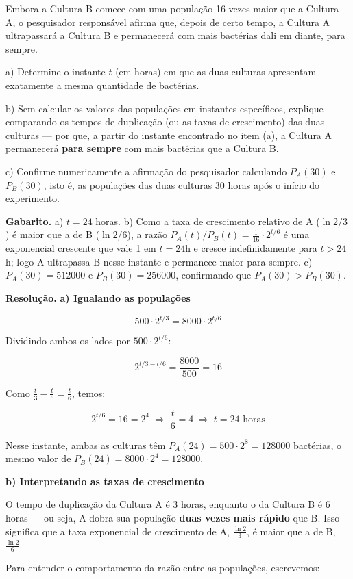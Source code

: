 \documentclass[11pt,a4paper]{article}
\begin{document}
Embora a Cultura B comece com uma população 16 vezes maior que a Cultura A, o pesquisador responsável afirma que, depois de certo tempo, a Cultura A ultrapassará a Cultura B e permanecerá com mais bactérias dali em diante, para sempre.

a) Determine o instante $t$ (em horas) em que as duas culturas apresentam exatamente a mesma quantidade de bactérias.

b) Sem calcular os valores das populações em instantes específicos, explique — comparando os tempos de duplicação (ou as taxas de crescimento) das duas culturas — por que, a partir do instante encontrado no item (a), a Cultura A permanecerá \textbf{para sempre} com mais bactérias que a Cultura B.

c) Confirme numericamente a afirmação do pesquisador calculando $P_A(30)$ e $P_B(30)$, isto é, as populações das duas culturas 30 horas após o início do experimento.

\textbf{Gabarito.} a) $t = 24$ horas. b) Como a taxa de crescimento relativo de A ($\ln 2/3$) é maior que a de B ($\ln 2/6$), a razão $P_A(t)/P_B(t) = \frac{1}{16}\cdot 2^{t/6}$ é uma exponencial crescente que vale 1 em $t=24$h e cresce indefinidamente para $t>24$h; logo A ultrapassa B nesse instante e permanece maior para sempre. c) $P_A(30)=512000$ e $P_B(30)=256000$, confirmando que $P_A(30) > P_B(30)$.

\textbf{Resolução.} \textbf{a) Igualando as populações}

$$500 \cdot 2^{t/3} = 8000 \cdot 2^{t/6}$$

Dividindo ambos os lados por $500 \cdot 2^{t/6}$:

$$2^{t/3 - t/6} = \frac{8000}{500} = 16$$

Como $\frac{t}{3} - \frac{t}{6} = \frac{t}{6}$, temos:

$$2^{t/6} = 16 = 2^4 \;\Rightarrow\; \frac{t}{6} = 4 \;\Rightarrow\; t = 24 \text{ horas}$$

Nesse instante, ambas as culturas têm $P_A(24)=500\cdot 2^8 = 128000$ bactérias, o mesmo valor de $P_B(24) = 8000\cdot 2^4 = 128000$.

\textbf{b) Interpretando as taxas de crescimento}

O tempo de duplicação da Cultura A é 3 horas, enquanto o da Cultura B é 6 horas — ou seja, A dobra sua população \textbf{duas vezes mais rápido} que B. Isso significa que a taxa exponencial de crescimento de A, $\frac{\ln 2}{3}$, é maior que a de B, $\frac{\ln 2}{6}$.

Para entender o comportamento da razão entre as populações, escrevemos:
\end{document}
